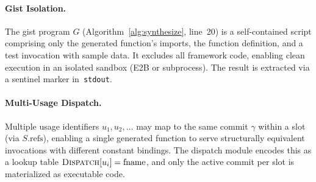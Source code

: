 \paragraph{Gist Isolation.}
The gist program $G$ (Algorithm~\ref{alg:synthesize}, line~20) is a
self-contained script comprising only the generated function's imports, the
function definition, and a test invocation with sample data.  It excludes all
framework code, enabling clean execution in an isolated sandbox (E2B or
subprocess).  The result is extracted via a sentinel marker in~\texttt{stdout}.

\paragraph{Multi-Usage Dispatch.}
Multiple usage identifiers $u_1, u_2, \dots$ may map to the same commit
$\gamma$ within a slot (via $S.\mathrm{refs}$), enabling a single generated
function to serve structurally equivalent invocations with different constant
bindings.  The dispatch module encodes this as a lookup table
$\textsc{Dispatch}[u_i] = \mathrm{fname}$, and only the active commit per
slot is materialized as executable code.
